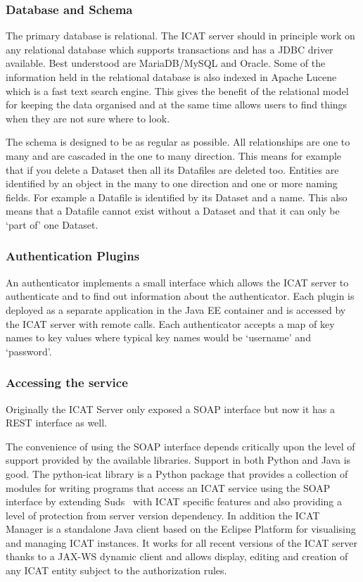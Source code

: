 \documentclass[a4paper]{jpconf}
\begin{document}
\subsubsection{Database and Schema}
The primary database is relational. The ICAT server should in
principle work on any relational database which supports transactions
and has a JDBC driver available. Best understood are MariaDB/MySQL and
Oracle. Some of the information held in the relational database is
also indexed in Apache Lucene~\cite{ref:lucene} which is a fast text search engine.
This gives the benefit of the relational model for keeping the data
organised and at the same time allows users to find things when they
are not sure where to look.

The schema is designed to be as regular as possible. All relationships
are one to many and are cascaded in the one to many direction. This
means for example that if you delete a Dataset then all its Datafiles
are deleted too. Entities are identified by an object in the many to
one direction and one or more naming fields. For example a Datafile is
identified by its Dataset and a name. This also means that a Datafile
cannot exist without a Dataset and that it can only be `part of' one
Dataset.

\subsubsection{Authentication Plugins}
An authenticator implements a small interface which allows the ICAT
server to authenticate and to find out information about the
authenticator. Each plugin is deployed as a separate application in
the Java EE container and is accessed by the ICAT server with remote
calls. Each authenticator accepts a map of key names to key values
where typical key names would be `username' and `password'.

\subsubsection{Accessing the service}
Originally the ICAT Server only exposed a SOAP interface but now it
has a REST interface as well.

The convenience of using the SOAP interface depends critically upon
the level of support provided by the available libraries. Support in
both Python and Java is good. The python-icat library is a Python
package that provides a collection of modules for writing programs
that access an ICAT service using the SOAP interface by extending
Suds~\cite{ref:suds_jurko} with ICAT specific features and also
providing a level of protection from server version dependency. In
addition the ICAT Manager is a standalone Java client based on the
Eclipse Platform for visualising and managing ICAT instances. It works
for all recent versions of the ICAT server thanks to a JAX-WS dynamic
client and allows display, editing and creation of any ICAT entity
subject to the authorization rules.
\end{document}
